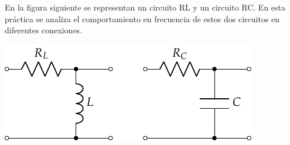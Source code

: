 \documentclass[a4paper,10pt]{article} %
\begin{document}

\vspace{0.3cm}

En la figura siguiente se representan un circuito RL y un circuito RC. En esta práctica se analiza el comportamiento en frecuencia de estos dos circuitos en diferentes conexiones.

\begin{center}
  \includegraphics[height=0.09\textheight]{../figs/circuito_P6}
\end{center}
\end{document}

